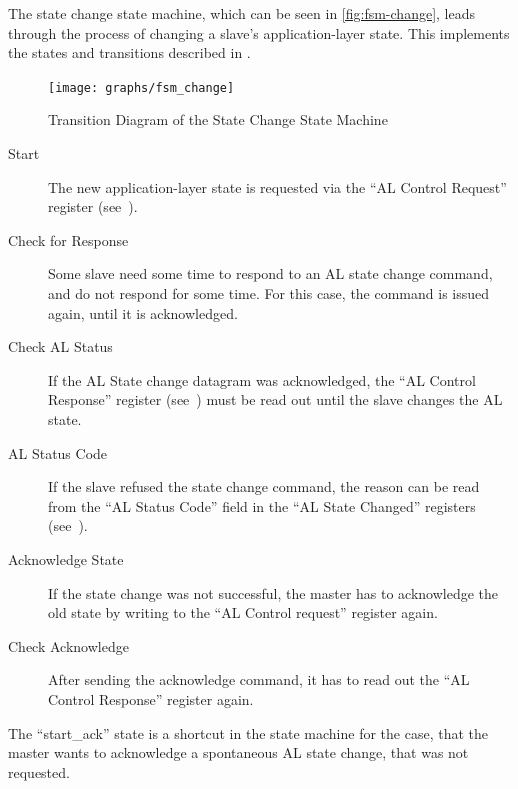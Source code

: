 \documentclass[a4paper,12pt,BCOR6mm,bibtotoc,idxtotoc]{scrbook}
\begin{document}
The state change state machine, which can be seen in
\autoref{fig:fsm-change}, leads through the process of changing a slave's
application-layer state. This implements the states and transitions described
in \cite[sec.~6.4.1]{alspec}.

\begin{figure}[htbp]
  \centering
  \texttt{[image: graphs/fsm\_change]}
  \caption{Transition Diagram of the State Change State Machine}
  \label{fig:fsm-change}
\end{figure}

\begin{description}

\item[Start] The new application-layer state is requested via the ``AL Control
Request'' register (see~\cite[sec. 5.3.1]{alspec}).

\item[Check for Response] Some slave need some time to respond to an AL state
change command, and do not respond for some time. For this case, the command
is issued again, until it is acknowledged.

\item[Check AL Status] If the AL State change datagram was acknowledged, the
``AL Control Response'' register (see~\cite[sec. 5.3.2]{alspec}) must be read
out until the slave changes the AL state.

\item[AL Status Code] If the slave refused the state change command, the
reason can be read from the ``AL Status Code'' field in the ``AL State
Changed'' registers (see~\cite[sec. 5.3.3]{alspec}).

\item[Acknowledge State] If the state change was not successful, the master
has to acknowledge the old state by writing to the ``AL Control request''
register again.

\item[Check Acknowledge] After sending the acknowledge command, it has to read
out the ``AL Control Response'' register again.

\end{description}

The ``start\_ack'' state is a shortcut in the state machine for the case, that
the master wants to acknowledge a spontaneous AL state change, that was not
requested.

\end{document}
